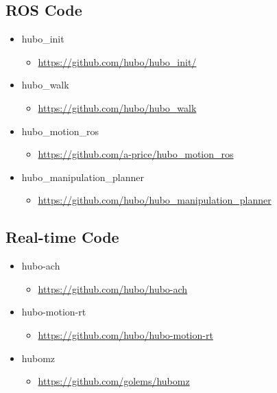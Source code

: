 \documentclass[letterpaper, 10 pt]{report}
\begin{document}
\subsection*{ROS Code}
\begin{itemize}
\item hubo\_init
	\begin{itemize}
	\item \url{https://github.com/hubo/hubo\_init/}
	\end{itemize}
\item hubo\_walk
	\begin{itemize}
	\item \url{https://github.com/hubo/hubo\_walk}
	\end{itemize}
\item hubo\_motion\_ros
	\begin{itemize}
	\item \url{https://github.com/a-price/hubo\_motion\_ros}
	\end{itemize}
\item hubo\_manipulation\_planner
	\begin{itemize}
	\item \url{https://github.com/hubo/hubo\_manipulation\_planner}
	\end{itemize}
\end{itemize}
\subsection*{Real-time Code}
\begin{itemize}
\item hubo-ach
	\begin{itemize}
	\item \url{https://github.com/hubo/hubo-ach}
	\end{itemize}
\item hubo-motion-rt
	\begin{itemize}
	\item \url{https://github.com/hubo/hubo-motion-rt}
	\end{itemize}
\item hubomz
	\begin{itemize}
	\item \url{https://github.com/golems/hubomz}
	\end{itemize}
\end{itemize}
\newpage

%
\end{document}
